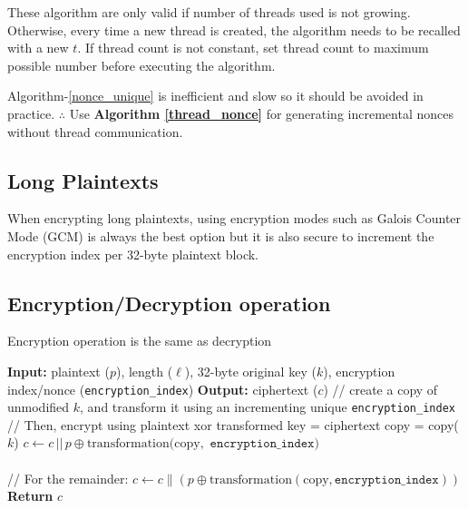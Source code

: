 \documentclass[11pt]{article}
\theoremstyle{definition}
\theoremstyle{remark}
\newcommand{\COMMENT}[1]{\State \textcolor[HTML]{003e57}{// #1}}
\begin{document}
These algorithm are only valid if number of threads used is not growing. Otherwise, every time a new thread is created, the algorithm needs to be recalled with a new $t$. If thread count is not constant, set thread count to maximum possible number before executing the algorithm.

Algorithm-\hspace{0.1em}\protect\ref{nonce_unique} is inefficient and slow so it should be avoided in practice.
$\therefore $ Use \textbf{Algorithm \hspace{0.1em}\protect\ref{thread_nonce}} for generating incremental nonces without thread communication.

\subsection {Long Plaintexts}

When encrypting long plaintexts, using encryption modes such as Galois Counter Mode (GCM) is always the best option but it is also secure to increment the encryption index per 32-byte plaintext block.

\subsection {Encryption/Decryption operation}

Encryption operation is the same as decryption

\begin{algorithm}[H] %
\caption{Encrypt/Decrypt transform Function}
\begin{algorithmic}[1]  %
\State \textbf{Input:} plaintext ($p$), length ($\ell$), 32-byte original key ($k$), encryption index/nonce (\texttt{encryption\_index})
\State \textbf{Output:} ciphertext ($c$)
	\COMMENT{create a copy of unmodified $k$, and transform it using an incrementing unique \texttt{encryption\_index}}
	\COMMENT{Then, encrypt using plaintext xor transformed key = ciphertext}
	\State copy = copy($k$)
	\State $c \gets c \,||\, p \oplus \mathrm{transformation(copy, } \texttt{  encryption\_index})$
\EndFor\\
\\
\COMMENT{For the remainder:}
\State $c \gets c \parallel (p \oplus \mathrm{transformation}(\mathrm{copy}, \texttt{encryption\_index}))$
\State \textbf{Return} $c$
\end{algorithmic}
\end{algorithm}
\end{document}
